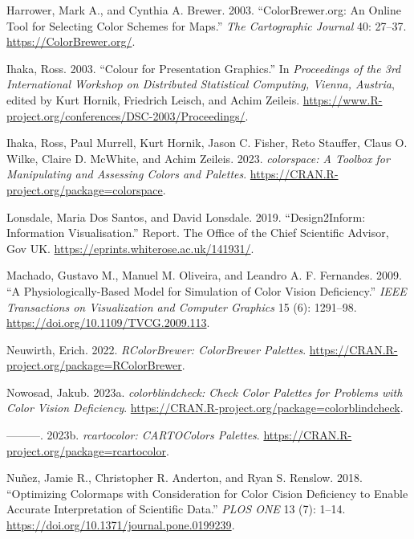 \begin{CSLReferences}{1}{0}
\leavevmode{}%
Harrower, Mark A., and Cynthia A. Brewer. 2003. {``{ColorBrewer.org}: An Online Tool for Selecting Color Schemes for Maps.''} \emph{The Cartographic Journal} 40: 27--37. \url{https://ColorBrewer.org/}.

\leavevmode{}%
Ihaka, Ross. 2003. {``Colour for Presentation Graphics.''} In \emph{Proceedings of the 3rd International Workshop on Distributed Statistical Computing, Vienna, Austria}, edited by Kurt Hornik, Friedrich Leisch, and Achim Zeileis. \url{https://www.R-project.org/conferences/DSC-2003/Proceedings/}.

\leavevmode{}%
Ihaka, Ross, Paul Murrell, Kurt Hornik, Jason C. Fisher, Reto Stauffer, Claus O. Wilke, Claire D. McWhite, and Achim Zeileis. 2023. \emph{{colorspace}: A Toolbox for Manipulating and Assessing Colors and Palettes}. \url{https://CRAN.R-project.org/package=colorspace}.

\leavevmode{}%
Lonsdale, Maria Dos Santos, and David Lonsdale. 2019. {``{Design2Inform}: Information Visualisation.''} Report. The Office of the Chief Scientific Advisor, Gov UK. \url{https://eprints.whiterose.ac.uk/141931/}.

\leavevmode{}%
Machado, Gustavo M., Manuel M. Oliveira, and Leandro A. F. Fernandes. 2009. {``A Physiologically-Based Model for Simulation of Color Vision Deficiency.''} \emph{IEEE Transactions on Visualization and Computer Graphics} 15 (6): 1291--98. \url{https://doi.org/10.1109/TVCG.2009.113}.

\leavevmode{}%
Neuwirth, Erich. 2022. \emph{{RColorBrewer}: ColorBrewer Palettes}. \url{https://CRAN.R-project.org/package=RColorBrewer}.

\leavevmode{}%
Nowosad, Jakub. 2023a. \emph{{colorblindcheck}: Check Color Palettes for Problems with Color Vision Deficiency}. \url{https://CRAN.R-project.org/package=colorblindcheck}.

\leavevmode{}%
---------. 2023b. \emph{{rcartocolor}: CARTOColors Palettes}. \url{https://CRAN.R-project.org/package=rcartocolor}.

\leavevmode{}%
Nuñez, Jamie R., Christopher R. Anderton, and Ryan S. Renslow. 2018. {``Optimizing Colormaps with Consideration for Color Cision Deficiency to Enable Accurate Interpretation of Scientific Data.''} \emph{PLOS ONE} 13 (7): 1--14. \url{https://doi.org/10.1371/journal.pone.0199239}.


\end{CSLReferences}
